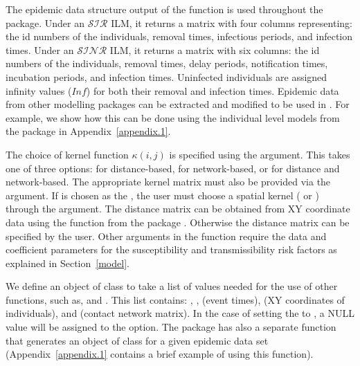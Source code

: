 \documentclass[nojss,shortnames]{jss}
\begin{document}
The epidemic data structure output of the  function is used throughout the  package. Under an $\mathcal{SIR}$ ILM, it returns a matrix with four columns representing: the id numbers of the individuals, removal times, infectious periods, and infection times. Under an $\mathcal{SINR}$ ILM, it returns a matrix with six columns: the id numbers of the individuals, removal times, delay periods, notification times, incubation periods, and infection times. Uninfected individuals are assigned infinity values ($Inf$) for both their removal and infection times. Epidemic data from other modelling packages can be extracted and modified to be used in . For example, we show how this can be done using the individual level models from the  package in Appendix~\ref{appendix.1}.


The choice of kernel function $\kappa(i,j)$ is specified using the  argument. This takes one of three options:  for distance-based,  for network-based, or  for distance and network-based. The appropriate kernel matrix must also be provided via the  argument. If  is chosen as the , the user must choose a spatial kernel ( or ) through the  argument. The distance matrix can be obtained from XY coordinate data using the  function from the  package \citep{CRAN}. Otherwise the distance matrix can be specified by the user. Other arguments in the  function require the data and coefficient parameters for the susceptibility and transmissibility risk factors as explained in Section~\ref{model}. 

We define an object of class  to take a list of values needed for the use of other functions, such as,  and . This list contains: , ,  (event times),  (XY coordinates of individuals), and  (contact network matrix). In the case of setting the  to , a NULL value will be assigned to the  option. The package has also a separate function  that generates an object of class  for a given epidemic data set (Appendix~\ref{appendix.1} contains a brief example of using this function).
\end{document}
